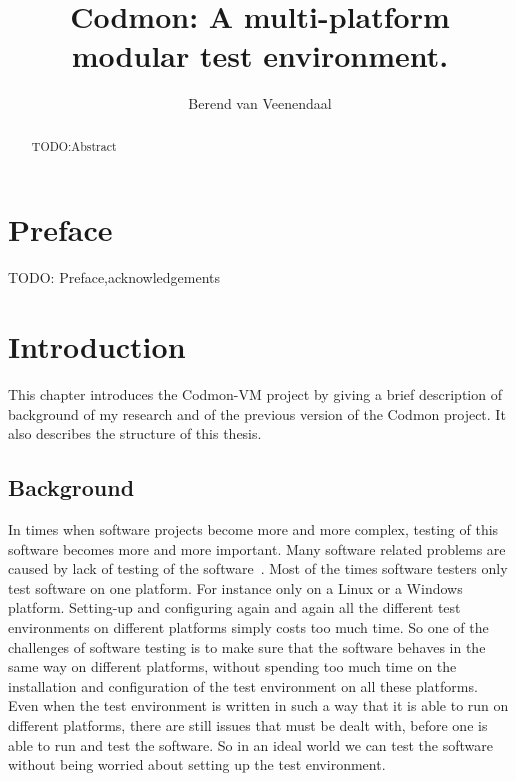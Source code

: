 \documentclass[a4paper,10pt]{scrartcl}
\title{Codmon: A multi-platform modular test environment.}
\author{Berend van Veenendaal}
\newcommand{\project}{Codmon-VM}
\begin{document}
\maketitle

\begin{abstract}
TODO:Abstract
\end{abstract}
\newpage
\section*{Preface}
\label{sec:Preface}
TODO: Preface,acknowledgements
\newpage
\tableofcontents
\newpage

\section{Introduction}
\label{sec:Introduction}
This chapter introduces the \project{} project by giving a brief description of background of my research and of the
previous version of the Codmon project. It also describes the structure of this thesis.

\subsection{Background}
\label{sec:Background}
In times when software projects become more and more complex, testing of this software becomes more and more important. Many software related problems are caused by lack of testing of the 
software~\cite{TTCST}. Most of the times software testers only test software on one platform. For instance only on a Linux or a Windows platform. Setting-up and configuring again and again all 
the different test environments on different platforms simply costs too much time. So one of the challenges of software testing is to make sure that the software behaves in the same way on 
different platforms, without spending too much time on the installation and configuration of the test environment on all these platforms. Even when the test environment is written in such a way 
that it is able to run on different platforms, there are still issues that must be dealt with, before one is able to run and test the software. So in an ideal world we can test the software without being 
worried about setting up the test environment. 
\end{document}
